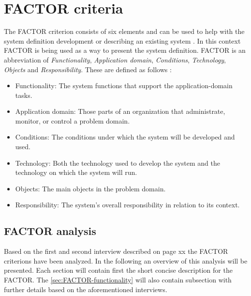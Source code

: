 \section{FACTOR criteria} \label{sec:factorcriteria}
The FACTOR criterion consists of six elements and can be used to help with the system definition development or describing an existing system
. 
In this context FACTOR is being used as a way to present the system definition.
FACTOR is an abbreviation of \textit{Functionality}, \textit{Application domain}, \textit{Conditions}, \textit{Technology}, \textit{Objects} and \textit{Responsibility}.
These are defined as follows \citep[p.~40]{Rod-Aalborg}:
\begin{itemize}
	\item
	 Functionality: 
	 The system functions that support the application-domain tasks.
	\item
	 Application domain: 
	 Those parts of an organization that administrate, monitor, or control a problem domain.
	\item
	 Conditions: 
	 The conditions under which the system will be developed and used.
	\item
	 Technology: 
	 Both the technology used to develop the system and the technology on which the system will run.
	\item
	 Objects: 
	 The main objects in the problem domain.
	\item
	 Responsibility: 
	 The system’s overall responsibility in relation to its context.
\end{itemize}

\subsection{FACTOR analysis}
Based on the first and second interview described on page xx the FACTOR criterions have been analyzed. 
In the following an overview of this analysis will be presented.
Each section will contain first the short concise description for the FACTOR. 
The \cref{sec:FACTOR-functionality} will also contain subsection with further details based on the aforementioned interviews. 

